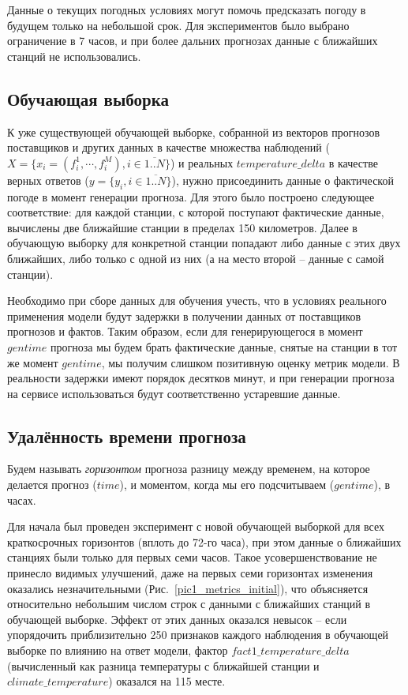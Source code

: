 \documentclass[14pt]{matmex-diploma}
\begin{document}
Данные о текущих погодных условиях могут помочь предсказать погоду в будущем только на небольшой срок. Для экспериментов было выбрано ограничение в 7 часов, и при более дальних прогнозах данные с ближайших станций не использовались.

\subsection{Обучающая выборка}
К уже существующей обучающей выборке, собранной из векторов прогнозов поставщиков и других данных в качестве множества наблюдений ($X = \{x_i = (f^1_{i}, \cdots, f^M_i), i \in \overline{1..N}\}$) и реальных $temperature\_delta$ в качестве верных ответов ($y = \{y_i, i \in \overline{1..N}\}$), нужно присоединить данные о фактической погоде в момент генерации прогноза. Для этого было построено следующее соответствие: для каждой станции, с которой поступают фактические данные, вычислены две ближайшие станции в пределах 150 километров. Далее в обучающую выборку для конкретной станции попадают либо данные с этих двух ближайших, либо только с одной из них (а на место второй -- данные с самой станции). %

Необходимо при сборе данных для обучения учесть, что в условиях реального применения модели будут задержки в получении данных от поставщиков прогнозов и фактов. Таким образом, если для генерирующегося в момент $gentime$ прогноза мы будем брать фактические данные, снятые на станции в тот же момент $gentime$, мы получим слишком позитивную оценку метрик модели. В реальности задержки имеют порядок десятков минут, и при генерации прогноза на сервисе использоваться будут соответственно устаревшие данные.




\subsection{Удалённость времени прогноза}

Будем называть \textit{горизонтом} прогноза разницу между временем, на которое делается прогноз ($time$), и моментом, когда мы его подсчитываем ($gentime$), в часах.

Для начала был проведен эксперимент с новой обучающей выборкой для всех краткосрочных горизонтов (вплоть до 72-го часа), при этом данные о ближайших станциях были только для первых семи часов. Такое усовершенствование не принесло видимых улучшений, даже на первых семи горизонтах изменения оказались незначительными (Рис.~\ref{pic1_metrics_initial}), что объясняется относительно небольшим числом строк с данными с ближайших станций в обучающей выборке. Эффект от этих данных оказался невысок -- если упорядочить приблизительно 250 признаков каждого наблюдения в обучающей выборке по влиянию на ответ модели, фактор $fact1\_temperature\_delta$ (вычисленный как разница температуры с ближайшей станции и $climate\_temperature$) оказался на 115 месте.
\end{document}
